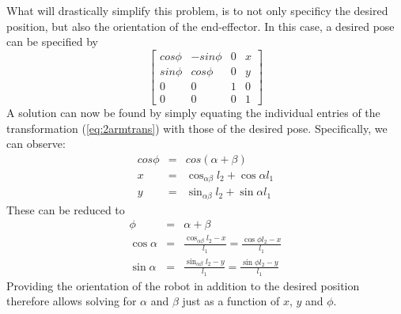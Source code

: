 What will drastically simplify this problem, is to not only specificy the desired position, but also the orientation of the end-effector. In this case, a desired pose can be specified by
\begin{equation}
\left[
\begin{array}{cccc}
cos\phi & -sin\phi & 0 & x\\
sin\phi & cos\phi & 0 & y\\
0 & 0 & 1 & 0\\
0 & 0 & 0 & 1
\end{array}
\right]
\end{equation}
A solution can now be found by simply equating the individual entries of the transformation (\ref{eq:2armtrans}) with those of the desired pose. Specifically, we can observe:
\begin{eqnarray}
cos\phi &=& cos(\alpha+\beta)\\
\nonumber
x &=& \cos_{\alpha\beta}l_2+\cos\alpha l_1\\
\nonumber
y &=& \sin_{\alpha\beta}l_2+\sin\alpha l_1
\end{eqnarray}
These can be reduced to
\begin{eqnarray}
\phi &=& \alpha + \beta \nonumber \\
\cos\alpha &=& \frac{\cos_{\alpha\beta}l_2-x}{l_1}=\frac{\cos\phi l_2-x}{l_1} \\
\sin\alpha &=& \frac{\sin_{\alpha\beta}l_2-y}{l_1}=\frac{\sin\phi l_2-y}{l_1} \nonumber
\end{eqnarray}
Providing the orientation of the robot in addition to the desired position therefore allows solving for $\alpha$ and $\beta$ just as a function of $x$, $y$ and $\phi$.

